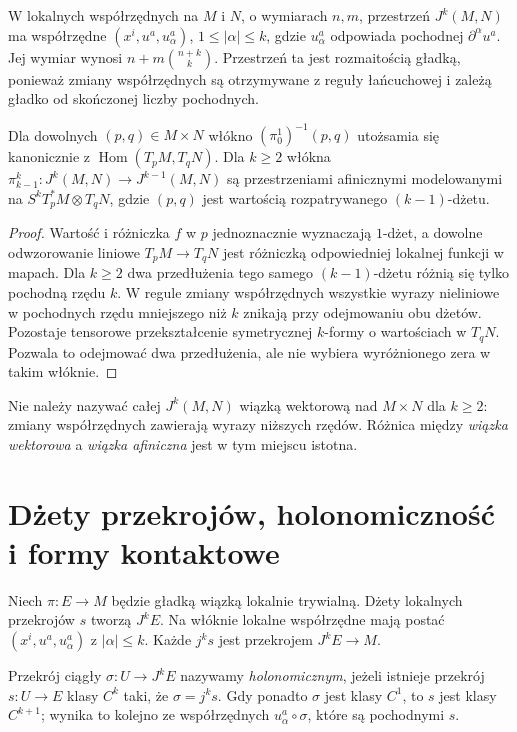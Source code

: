 W lokalnych współrzędnych na $M$ i $N$, o wymiarach $n,m$,
przestrzeń $J^k(M,N)$ ma współrzędne $(x^i,u^a,u^a_\alpha)$,
$1\le|\alpha|\le k$, gdzie $u^a_\alpha$ odpowiada pochodnej
$\partial^\alpha u^a$. Jej wymiar wynosi
$n+m\binom{n+k}{k}$. Przestrzeń ta jest rozmaitością gładką,
ponieważ zmiany współrzędnych są otrzymywane z reguły
łańcuchowej i zależą gładko od skończonej liczby pochodnych.

\begin{twierdzenie}
\label{thm:dzety-affine}
Dla dowolnych $(p,q)\in M\times N$ włókno
$(\pi_0^1)^{-1}(p,q)$ utożsamia się kanonicznie z
$\operatorname{Hom}(T_pM,T_qN)$. Dla $k\ge2$ włókna
$\pi_{k-1}^k:J^k(M,N)\to J^{k-1}(M,N)$ są przestrzeniami
afinicznymi modelowanymi na
$S^kT_p^*M\otimes T_qN$, gdzie $(p,q)$ jest
wartością rozpatrywanego $(k-1)$-dżetu.
\end{twierdzenie}
\begin{proof}
Wartość i różniczka $f$ w $p$ jednoznacznie wyznaczają
$1$-dżet, a dowolne odwzorowanie liniowe
$T_pM\to T_qN$ jest różniczką odpowiedniej lokalnej funkcji
w mapach. Dla $k\ge2$ dwa przedłużenia tego samego
$(k-1)$-dżetu różnią się tylko pochodną rzędu $k$.
W regule zmiany współrzędnych wszystkie wyrazy
nieliniowe w pochodnych rzędu mniejszego niż $k$ znikają
przy odejmowaniu obu dżetów. Pozostaje tensorowe
przekształcenie symetrycznej $k$-formy o wartościach
w $T_qN$. Pozwala to odejmować dwa przedłużenia,
ale nie wybiera wyróżnionego zera w takim włóknie.
\end{proof}

\begin{uwaga}
Nie należy nazywać całej $J^k(M,N)$ wiązką wektorową
nad $M\times N$ dla $k\ge2$: zmiany współrzędnych
zawierają wyrazy niższych rzędów. Różnica między
\emph{wiązka wektorowa} a \emph{wiązka afiniczna}
jest w tym miejscu istotna.
\end{uwaga}

\section{Dżety przekrojów, holonomiczność i formy kontaktowe}
Niech $\pi:E\to M$ będzie gładką wiązką lokalnie trywialną.
Dżety lokalnych przekrojów $s$ tworzą $J^kE$.
Na włóknie lokalne współrzędne mają postać
$(x^i,u^a,u^a_\alpha)$ z $|\alpha|\le k$.
Każde $j^ks$ jest przekrojem $J^kE\to M$.

\begin{definicja}
\label{def:dzety-holonomic}
Przekrój ciągły $\sigma:U\to J^kE$ nazywamy
\emph{holonomicznym}, jeżeli istnieje przekrój
$s:U\to E$ klasy $C^k$ taki, że $\sigma=j^ks$.
Gdy ponadto $\sigma$ jest klasy $C^1$, to $s$ jest
klasy $C^{k+1}$; wynika to kolejno ze współrzędnych
$u^a_\alpha\circ\sigma$, które są pochodnymi $s$.
\end{definicja}

